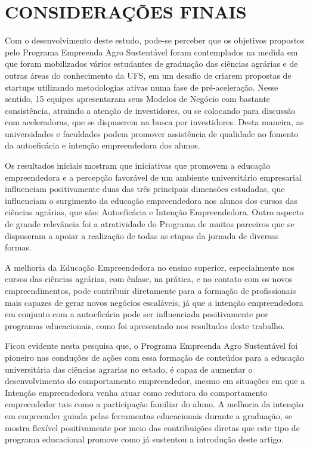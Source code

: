 \chapter{CONSIDERAÇÕES FINAIS}


Com o desenvolvimento deste estudo, pode-se perceber que os objetivos propostos pelo Programa Empreenda Agro Sustentável foram contemplados na medida em que foram mobilizados vários estudantes de graduação das ciências agrárias e de outras áreas do conhecimento da UFS, em um desafio de criarem propostas de startups utilizando metodologias ativas numa fase de pré-aceleração. Nesse sentido, 15 equipes apresentaram seus Modelos de Negócio com bastante consistência, atraindo a atenção de investidores, ou se colocando para discussão com aceleradoras, que se dispuserem na busca por investidores. Desta maneira, as universidades e faculdades podem promover assistência de qualidade no fomento da autoeficácia e intenção empreendedora dos alunos.


Os resultados iniciais mostram que iniciativas que promovem a educação empreendedora e a percepção favorável de um ambiente universitário empresarial influenciam positivamente duas das três principais dimensões estudadas, que influenciam o surgimento da educação empreendedora nos alunos dos cursos das ciências agrárias, que são: Autoeficácia e Intenção Empreendedora. Outro aspecto de grande relevância foi a atratividade do Programa de muitos parceiros que se dispuseram a apoiar a realização de todas as etapas da jornada de diversas formas.

A melhoria da Educação Empreendedora no ensino superior, especialmente nos cursos das ciências agrárias, com ênfase, na prática, e no contato com os novos empreendimentos, pode contribuir diretamente para a formação de profissionais mais capazes de gerar novos negócios escaláveis, já que a intenção empreendedora em conjunto com a autoeficácia pode ser influenciada positivamente por programas educacionais, como foi apresentado nos resultados deste trabalho.

Ficou evidente nesta pesquisa que, o Programa Empreenda Agro Sustentável foi pioneiro nas conduções de ações com essa formação de conteúdos para a educação universitária das ciências agrarias no estado, é capaz de aumentar o desenvolvimento do comportamento empreendedor, mesmo em situações em que a Intenção empreendedora venha atuar como redutora do comportamento empreendedor tais como a participação familiar do aluno. A melhoria da intenção em empreender guiada pelas ferramentas educacionais durante a graduação, se mostra flexível positivamente por meio das contribuições diretas que este tipo de programa educacional promove como já sustentou a introdução deste artigo.

